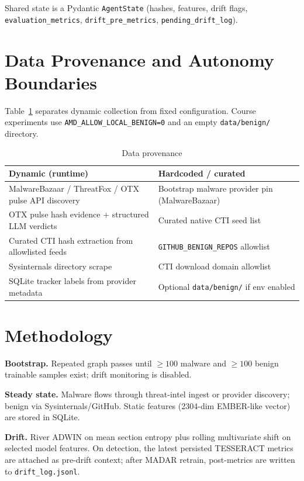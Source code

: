 \documentclass[11pt]{article}
\begin{document}
Shared state is a Pydantic \texttt{AgentState} (hashes, features, drift flags, \texttt{evaluation\_metrics}, \texttt{drift\_pre\_metrics}, \texttt{pending\_drift\_log}).

\section{Data Provenance and Autonomy Boundaries}
Table~\ref{tab:provenance} separates dynamic collection from fixed configuration. Course experiments use \texttt{AMD\_ALLOW\_LOCAL\_BENIGN=0} and an empty \texttt{data/benign/} directory.

\begin{table}[h]
\centering
\caption{Data provenance}
\label{tab:provenance}
\begin{tabular}{@{}ll@{}}
\toprule
\textbf{Dynamic (runtime)} & \textbf{Hardcoded / curated} \\
\midrule
MalwareBazaar / ThreatFox / OTX pulse API discovery & Bootstrap malware provider pin (MalwareBazaar) \\
OTX pulse hash evidence + structured LLM verdicts & Curated native CTI seed list \\
Curated CTI hash extraction from allowlisted feeds & \texttt{GITHUB\_BENIGN\_REPOS} allowlist \\
Sysinternals directory scrape & CTI download domain allowlist \\
SQLite tracker labels from provider metadata & Optional \texttt{data/benign/} if env enabled \\
\bottomrule
\end{tabular}
\end{table}

\section{Methodology}
\textbf{Bootstrap.} Repeated graph passes until $\geq 100$ malware and $\geq 100$ benign trainable samples exist; drift monitoring is disabled.

\textbf{Steady state.} Malware flows through threat-intel ingest or provider discovery; benign via Sysinternals/GitHub. Static features (2304-dim EMBER-like vector) are stored in SQLite.

\textbf{Drift.} River ADWIN on mean section entropy plus rolling multivariate shift on selected model features. On detection, the latest persisted TESSERACT metrics are attached as pre-drift context; after MADAR retrain, post-metrics are written to \texttt{drift\_log.jsonl}.
\end{document}
